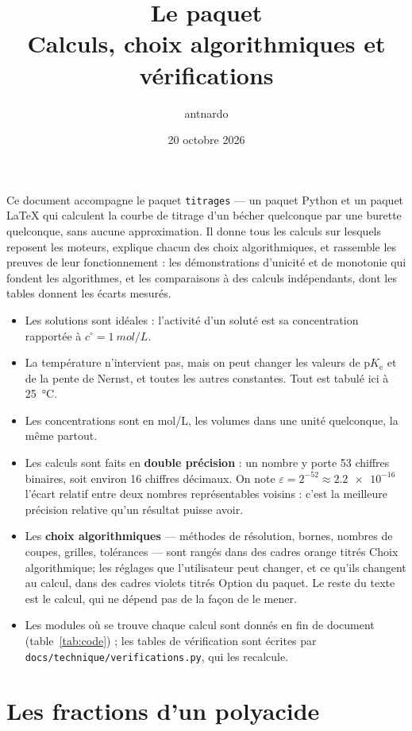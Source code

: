 \documentclass[a4paper,11pt]{article}
\title{Le paquet \code{titrages}\\[4pt] \large Calculs, choix algorithmiques et vérifications}
\author{antnardo}
\date{20 octobre 2026}
\newcommand\rmxcons[1]{\begin{tcolorbox}[rmq, rouge, left=3pt, fontupper=\small\itshape]\begin{itemize}[label=\ding{43}, leftmargin=*, topsep=0pt, itemsep=2pt]#1\end{itemize}\end{tcolorbox}}
\newcommand\gras[1]{\textbf{#1}}
\newcommand\pKe{\ensuremath{\mathrm{p}K_\mathrm{e}}\xspace}
\newcommand\code[1]{\texttt{#1}}
\newcommand\eps{\varepsilon}
\begin{document}
\maketitle

Ce document accompagne le paquet \code{titrages} — un paquet Python et un paquet \LaTeX{} qui calculent la courbe de titrage d'un bécher quelconque par une burette quelconque, sans aucune approximation.
Il donne tous les calculs sur lesquels reposent les moteurs, explique chacun des choix algorithmiques, et rassemble les preuves de leur fonctionnement : les démonstrations d'unicité et de monotonie qui fondent les algorithmes, et les comparaisons à des calculs indépendants, dont les tables donnent les écarts mesurés.

\rmxcons{
\item Les solutions sont idéales : l'activité d'un soluté est sa concentration rapportée à $c^\circ=\qty{1}{mol/L}$.
\item La température n'intervient pas, mais on peut changer les valeurs de \pKe et de la pente de Nernst, et toutes les autres constantes.
Tout est tabulé ici à \qty{25}{\celsius}.
\item Les concentrations sont en \unit{mol/L}, les volumes dans une unité quelconque, la même partout.
\item Les calculs sont faits en \gras{double précision} : un nombre y porte 53 chiffres binaires, soit environ 16 chiffres décimaux.
On note $\eps=2^{-52}\approx\num{2.2e-16}$ l'écart relatif entre deux nombres représentables voisins : c'est la meilleure précision relative qu'un résultat puisse avoir.
\item Les \gras{choix algorithmiques} — méthodes de résolution, bornes, nombres de coupes, grilles, tolérances — sont rangés dans des cadres orange titrés \og Choix algorithmique\fg ; les réglages que l'utilisateur peut changer, et ce qu'ils changent au calcul, dans des cadres violets titrés \og Option du paquet\fg.
Le reste du texte est le calcul, qui ne dépend pas de la façon de le mener.
\item Les modules où se trouve chaque calcul sont donnés en fin de document (table~\ref{tab:code}) ; les tables de vérification sont écrites par \code{docs/technique/verifications.py}, qui les recalcule.
}

\tableofcontents

\section{Les fractions d'un polyacide}\label{sec:fractions}
\end{document}
